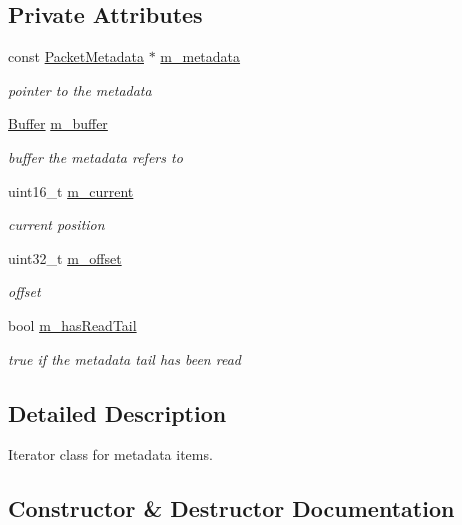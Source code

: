 \subsection*{Private Attributes}
\begin{DoxyCompactItemize}
\item 
const \hyperlink{classns3_1_1PacketMetadata}{Packet\+Metadata} $\ast$ \hyperlink{classns3_1_1PacketMetadata_1_1ItemIterator_a6a91c392408e77624613663198f269a6}{m\+\_\+metadata}
\begin{DoxyCompactList}\small\item\em pointer to the metadata \end{DoxyCompactList}\item 
\hyperlink{classns3_1_1Buffer}{Buffer} \hyperlink{classns3_1_1PacketMetadata_1_1ItemIterator_a28a05c78e0009cfda77bc74d3eefb30e}{m\+\_\+buffer}
\begin{DoxyCompactList}\small\item\em buffer the metadata refers to \end{DoxyCompactList}\item 
uint16\+\_\+t \hyperlink{classns3_1_1PacketMetadata_1_1ItemIterator_a05a394b22a469fcd9adb8cf23916c437}{m\+\_\+current}
\begin{DoxyCompactList}\small\item\em current position \end{DoxyCompactList}\item 
uint32\+\_\+t \hyperlink{classns3_1_1PacketMetadata_1_1ItemIterator_aa1970b36f1f272fd758b68eea35339a3}{m\+\_\+offset}
\begin{DoxyCompactList}\small\item\em offset \end{DoxyCompactList}\item 
bool \hyperlink{classns3_1_1PacketMetadata_1_1ItemIterator_a8ed1eb05c698cb72588f997f72e2788e}{m\+\_\+has\+Read\+Tail}
\begin{DoxyCompactList}\small\item\em true if the metadata tail has been read \end{DoxyCompactList}\end{DoxyCompactItemize}


\subsection{Detailed Description}
Iterator class for metadata items. 

\subsection{Constructor \& Destructor Documentation}
